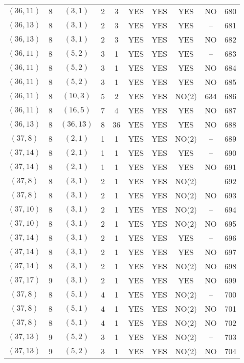 \begin{longtable}{|c|c|c|c|c|c|c|c|c|c|}
$(36, 11)$ & 8 & $(3, 1)$ & 2 & 3 & YES & YES & YES & NO & 680\\
$(36, 13)$ & 8 & $(3, 1)$ & 2 & 3 & YES & YES & YES & -- & 681\\
$(36, 13)$ & 8 & $(3, 1)$ & 2 & 3 & YES & YES & YES & NO & 682\\
$(36, 11)$ & 8 & $(5, 2)$ & 3 & 1 & YES & YES & YES & -- & 683\\
$(36, 11)$ & 8 & $(5, 2)$ & 3 & 1 & YES & YES & YES & NO & 684\\
$(36, 11)$ & 8 & $(5, 2)$ & 3 & 1 & YES & YES & YES & NO & 685\\
$(36, 11)$ & 8 & $(10, 3)$ & 5 & 2 & YES & YES & NO(2) & 634 & 686\\
$(36, 11)$ & 8 & $(16, 5)$ & 7 & 4 & YES & YES & YES & NO & 687\\
$(36, 13)$ & 8 & $(36, 13)$ & 8 & 36 & YES & YES & YES & NO & 688\\
$(37, 8)$ & 8 & $(2, 1)$ & 1 & 1 & YES & YES & NO(2) & -- & 689\\
$(37, 14)$ & 8 & $(2, 1)$ & 1 & 1 & YES & YES & YES & -- & 690\\
$(37, 14)$ & 8 & $(2, 1)$ & 1 & 1 & YES & YES & YES & NO & 691\\
$(37, 8)$ & 8 & $(3, 1)$ & 2 & 1 & YES & YES & NO(2) & -- & 692\\
$(37, 8)$ & 8 & $(3, 1)$ & 2 & 1 & YES & YES & NO(2) & NO & 693\\
$(37, 10)$ & 8 & $(3, 1)$ & 2 & 1 & YES & YES & NO(2) & -- & 694\\
$(37, 10)$ & 8 & $(3, 1)$ & 2 & 1 & YES & YES & NO(2) & NO & 695\\
$(37, 14)$ & 8 & $(3, 1)$ & 2 & 1 & YES & YES & YES & -- & 696\\
$(37, 14)$ & 8 & $(3, 1)$ & 2 & 1 & YES & YES & YES & NO & 697\\
$(37, 14)$ & 8 & $(3, 1)$ & 2 & 1 & YES & YES & NO(2) & NO & 698\\
$(37, 17)$ & 9 & $(3, 1)$ & 2 & 1 & YES & YES & YES & NO & 699\\
$(37, 8)$ & 8 & $(5, 1)$ & 4 & 1 & YES & YES & NO(2) & -- & 700\\
$(37, 8)$ & 8 & $(5, 1)$ & 4 & 1 & YES & YES & NO(2) & NO & 701\\
$(37, 8)$ & 8 & $(5, 1)$ & 4 & 1 & YES & YES & NO(2) & NO & 702\\
$(37, 13)$ & 9 & $(5, 2)$ & 3 & 1 & YES & YES & NO(2) & -- & 703\\
$(37, 13)$ & 9 & $(5, 2)$ & 3 & 1 & YES & YES & NO(2) & NO & 704\\

\end{longtable}

